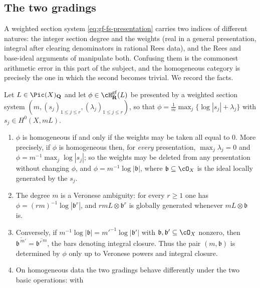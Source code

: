 \subsection{The two gradings}
\label{sec:ch38-two-gradings}

A weighted section system \eqref{eq:gf-fs-presentation} carries two
indices of different natures: the integer section degree and
the weights (real in a general presentation, integral after clearing
denominators in rational Rees data), and the Rees and base-ideal
arguments of
manipulate both.  Confusing them is the commonest arithmetic error in this
part of the subject, and the homogeneous category is precisely the one in
which the second becomes trivial.  We record the facts.

\begin{proposition}
\label{prop:ch38-two-gradings}
Let $L\in\Pic(X)_{\mathbf Q}$ and let $\phi\in\cH^{\mathrm{gf}}_{\mathbf R}(L)$
be presented by a weighted section system
$(m,(s_j)_{1\leq j\leq r},(\lambda_j)_{1\leq j\leq r})$, so that
$\phi=\frac1m\max_j\{\log|s_j|+\lambda_j\}$ with
$s_j\in H^0(X,mL)$.
\begin{enumerate}
\item\label{itm:ch38-grad:weight}
 $\phi$ is homogeneous if and only if the weights may be taken all equal
 to $0$.  More precisely, if $\phi$ is homogeneous then, for
 \emph{every} presentation, $\max_j\lambda_j=0$ and
 $\phi=m^{-1}\max_j\log|s_j|$; so the weights may be deleted from any
 presentation without changing $\phi$, and
 $\phi=m^{-1}\log|\mathfrak b|$, where
 $\mathfrak b\subseteq\cO_X$ is the ideal locally generated by the
 $s_j$.
\item\label{itm:ch38-grad:degree}
 The degree $m$ is a Veronese ambiguity: for every $r\geq1$ one has
 $\phi=(rm)^{-1}\log|\mathfrak b^r|$, and $rmL\otimes\mathfrak b^r$ is
 globally generated whenever $mL\otimes\mathfrak b$ is.
\item\label{itm:ch38-grad:integral}
 Conversely, if $m^{-1}\log|\mathfrak b|=m'^{-1}\log|\mathfrak b'|$ with
 $\mathfrak b,\mathfrak b'\subseteq\cO_X$ nonzero, then
 $\overline{\mathfrak b^{\,m'}}=\overline{\mathfrak b'^{\,m}}$, the bars
 denoting integral closure.  Thus the pair $(m,\mathfrak b)$ is
 determined by $\phi$ only up to Veronese powers and integral closure.
\item\label{itm:ch38-grad:operations}
 On homogeneous data the two gradings behave differently under the two
 basic operations: with

\end{enumerate}
\end{proposition}
